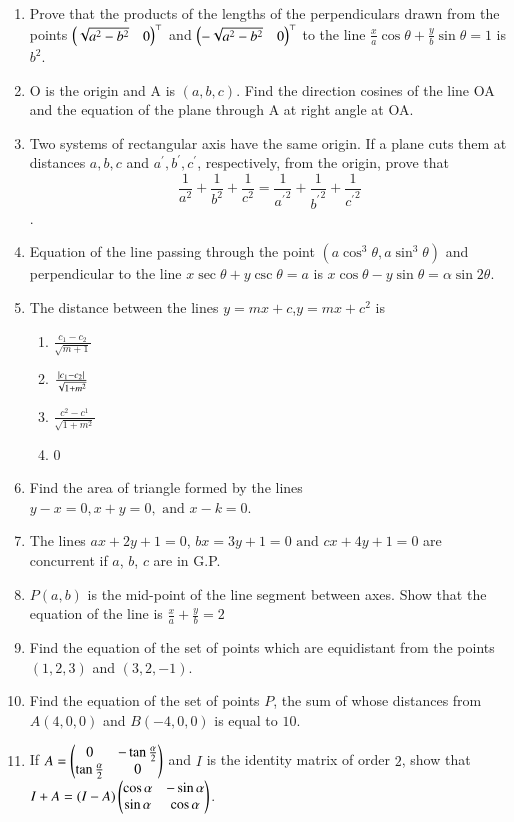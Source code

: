 \begin{enumerate}[label=\thesubsection.\arabic*,ref=\thesubsection.\theenumi]
	\item Prove that the products of the lengths of the perpendiculars drawn from the points $\begin{pmatrix}\sqrt{a^2-b^2}& 0\end{pmatrix}^{\top}$ and $\begin{pmatrix}-\sqrt{a^2-b^2} &0\end{pmatrix}^{\top}$ to the line $\frac{x}{a} \cos{\theta} + \frac{y}{b}\sin{\theta} =1 $ is $ b^2 $.
\\
    \solution 
		
\item O is the origin and A is $(a,b,c)$. Find the direction cosines of the line OA and the equation of the plane through A at right angle at OA.
\item Two systems of rectangular axis have the same origin. If a plane cuts them at distances $a,b,c$ and $a^{\prime},b^{\prime},c^{\prime}$, respectively, from the origin, prove that $$\frac{1}{a^2}+\frac{1}{b^2}+\frac{1}{c^2}=\frac{1}{{a^{\prime}}^2}+\frac{1}{{b^{\prime}}^2}+\frac{1}{{c^{\prime}}^2}$$.
\item Equation of the line passing through the point $(a\cos^3\theta, a\sin^3\theta)$ and perpendicular to the line $x\sec\theta+y\csc\theta=a$ is $x\cos\theta-y\sin\theta=\alpha\sin2\theta$.
\item The distance between the lines $y=mx+c$,$y=mx+c^2$ is
\begin{enumerate}
\item $\frac{c_1-c_2}{\sqrt{m+1}}$
\item $\frac{\left\vert c_1-c_2\right\vert}{\sqrt{1+m^2}}$
\item $\frac{c^2-c^1}{\sqrt{1+m^2}}$
\item 0
\end{enumerate}
	\item Find the area of triangle formed by the lines $y-x=0, x+y=0, \text{ and } x-k=0$.
		\\
\solution
		
\item The lines $ax+2y+1=0$, $bx=3y+1=0\text{ and }cx+4y+1=0$ are concurrent if $a$, $b$, $c$ are in G.P.
\item 
$P(a,b)$ is the mid-point of the line segment between axes. Show that the equation of the line is $\frac{x}{a}+\frac{y}{b}=2$
\label{chapters/11/10/2/18}
\\
\solution

\item Find the equation of the set of points which are equidistant from the points $(1,2,3)$ and $(3,2,-1)$.
\item Find the equation of the set of points $P$, the sum of whose distances from $A(4,0,0)$ and $B(-4,0,0)$ is equal to $10$.
\item If $A=\begin{pmatrix}0 & -\tan \frac{\alpha}{2} \\ \tan \frac{\alpha}{2} & 0\end{pmatrix}$  and $I$ is the identity matrix of order $2$, show that $I+A= (I-A) \begin{pmatrix}\cos \alpha & -\sin \alpha \\ \sin \alpha & \cos \alpha\end{pmatrix}$.
\end{enumerate}
